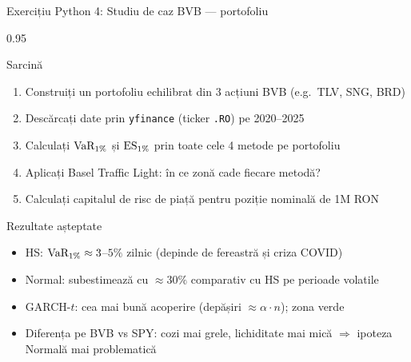 \documentclass[9pt, aspectratio=169, t]{beamer}
\begin{document}
\begin{frame}[shrink=10]{Exercițiu Python 4: Studiu de caz BVB --- portofoliu}
\begin{cminipage}{0.95\textwidth}
    \begin{block}{Sarcină}
    \begin{enumerate}\setlength{\itemsep}{0pt}
        \item Construiți un portofoliu echilibrat din 3 acțiuni BVB (e.g.\ TLV, SNG, BRD)
        \item Descărcați date prin \texttt{yfinance} (ticker \texttt{.RO}) pe 2020--2025
        \item Calculați $\text{VaR}_{1\%}$ și $\text{ES}_{1\%}$ prin toate cele 4 metode pe portofoliu
        \item Aplicați Basel Traffic Light: în ce zonă cade fiecare metodă?
        \item Calculați capitalul de risc de piață pentru poziție nominală de 1M RON
    \end{enumerate}
    \end{block}
    \vspace{0.15cm}
    \begin{alertblock}{Rezultate așteptate}
    \begin{itemize}\setlength{\itemsep}{0pt}
        \item HS: $\text{VaR}_{1\%} \approx 3$--$5\%$ zilnic (depinde de fereastră și criza COVID)
        \item Normal: subestimează cu $\approx 30\%$ comparativ cu HS pe perioade volatile
        \item GARCH-$t$: cea mai bună acoperire (depășiri $\approx \alpha \cdot n$); zona \textcolor{Forest}{verde}
        \item Diferența pe BVB vs SPY: cozi mai grele, lichiditate mai mică $\Rightarrow$ ipoteza Normală mai problematică
    \end{itemize}
    \end{alertblock}
\end{cminipage}
\end{frame}
\end{document}
